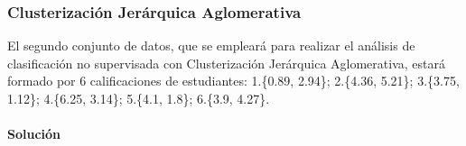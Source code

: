 \documentclass[a4paper, 12pt]{article}
\begin{document}
	\newpage
	
	\subsubsection{Clusterización Jerárquica Aglomerativa}
	
	El segundo conjunto de datos, que se empleará para realizar el análisis de clasificación no supervisada con Clusterización Jerárquica Aglomerativa, estará formado por 6 calificaciones de estudiantes: 1.\{0.89, 2.94\}; 2.\{4.36, 5.21\}; 3.\{3.75, 1.12\}; 4.\{6.25, 3.14\}; 5.\{4.1, 1.8\}; 6.\{3.9, 4.27\}.
	
	\paragraph{Solución}
\end{document}

